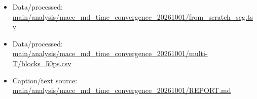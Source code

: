\begin{itemize}[leftmargin=1.4em,noitemsep]
\item Data/processed: \begingroup\scriptsize\url{main/analysis/mace_md_time_convergence_20261001/from_scratch_seg.tsv}\endgroup
\item Data/processed: \begingroup\scriptsize\url{main/analysis/mace_md_time_convergence_20261001/multi-T/blocks_50ps.csv}\endgroup
\item Caption/text source: \begingroup\scriptsize\url{main/analysis/mace_md_time_convergence_20261001/REPORT.md}\endgroup
\end{itemize}
